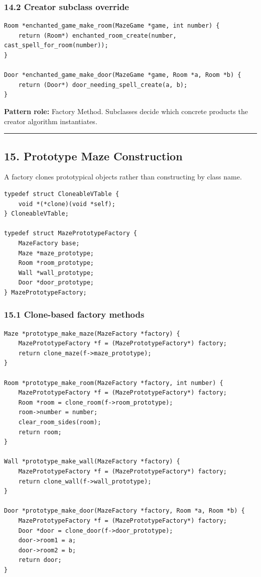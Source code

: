 \documentclass[11pt]{article}
\begin{document}
\subsubsection{14.2 Creator subclass override}\label{creator-subclass-override}

\begin{verbatim}
Room *enchanted_game_make_room(MazeGame *game, int number) {
    return (Room*) enchanted_room_create(number, cast_spell_for_room(number));
}

Door *enchanted_game_make_door(MazeGame *game, Room *a, Room *b) {
    return (Door*) door_needing_spell_create(a, b);
}
\end{verbatim}

\textbf{Pattern role:} Factory Method. Subclasses decide which concrete products the creator algorithm instantiates.

\begin{center}\rule{0.5\linewidth}{0.5pt}\end{center}

\subsection{15. Prototype Maze Construction}\label{prototype-maze-construction}

A factory clones prototypical objects rather than constructing by class name.

\begin{verbatim}
typedef struct CloneableVTable {
    void *(*clone)(void *self);
} CloneableVTable;

typedef struct MazePrototypeFactory {
    MazeFactory base;
    Maze *maze_prototype;
    Room *room_prototype;
    Wall *wall_prototype;
    Door *door_prototype;
} MazePrototypeFactory;
\end{verbatim}

\subsubsection{15.1 Clone-based factory methods}\label{clone-based-factory-methods}

\begin{verbatim}
Maze *prototype_make_maze(MazeFactory *factory) {
    MazePrototypeFactory *f = (MazePrototypeFactory*) factory;
    return clone_maze(f->maze_prototype);
}

Room *prototype_make_room(MazeFactory *factory, int number) {
    MazePrototypeFactory *f = (MazePrototypeFactory*) factory;
    Room *room = clone_room(f->room_prototype);
    room->number = number;
    clear_room_sides(room);
    return room;
}

Wall *prototype_make_wall(MazeFactory *factory) {
    MazePrototypeFactory *f = (MazePrototypeFactory*) factory;
    return clone_wall(f->wall_prototype);
}

Door *prototype_make_door(MazeFactory *factory, Room *a, Room *b) {
    MazePrototypeFactory *f = (MazePrototypeFactory*) factory;
    Door *door = clone_door(f->door_prototype);
    door->room1 = a;
    door->room2 = b;
    return door;
}
\end{verbatim}
\end{document}
